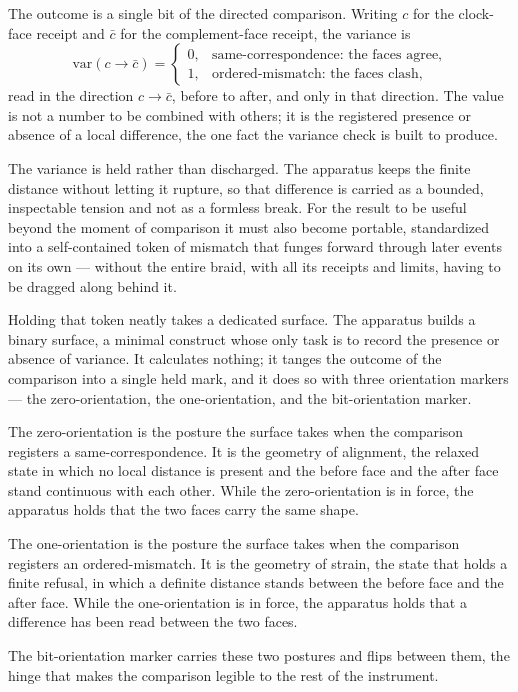 The outcome is a single bit of the directed comparison. Writing $c$ for the clock-face receipt and $\bar c$ for the complement-face receipt, the variance is
\[ \mathrm{var}(c \to \bar c) = \begin{cases} 0, & \text{same-correspondence: the faces agree,}\\ 1, & \text{ordered-mismatch: the faces clash,} \end{cases} \]
read in the direction $c \to \bar c$, before to after, and only in that direction. The value is not a number to be combined with others; it is the registered presence or absence of a local difference, the one fact the variance check is built to produce. 

The variance is held rather than discharged. The apparatus keeps the finite distance without letting it rupture, so that difference is carried as a bounded, inspectable tension and not as a formless break. For the result to be useful beyond the moment of comparison it must also become portable, standardized into a self-contained token of mismatch that funges forward through later events on its own --- without the entire braid, with all its receipts and limits, having to be dragged along behind it.

Holding that token neatly takes a dedicated surface. The apparatus builds a binary surface, a minimal construct whose only task is to record the presence or absence of variance. It calculates nothing; it tanges the outcome of the comparison into a single held mark, and it does so with three orientation markers --- the zero-orientation, the one-orientation, and the bit-orientation marker.

The zero-orientation is the posture the surface takes when the comparison registers a same-correspondence. It is the geometry of alignment, the relaxed state in which no local distance is present and the before face and the after face stand continuous with each other. While the zero-orientation is in force, the apparatus holds that the two faces carry the same shape.

The one-orientation is the posture the surface takes when the comparison registers an ordered-mismatch. It is the geometry of strain, the state that holds a finite refusal, in which a definite distance stands between the before face and the after face. While the one-orientation is in force, the apparatus holds that a difference has been read between the two faces.

The bit-orientation marker carries these two postures and flips between them, the hinge that makes the comparison legible to the rest of the instrument.

